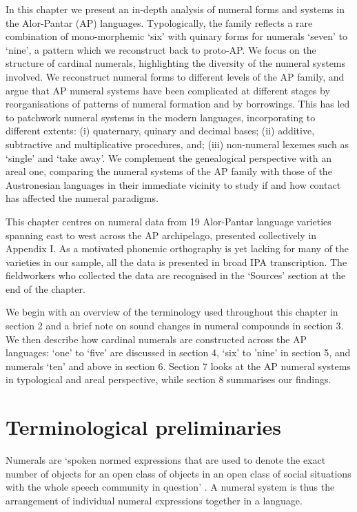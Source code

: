 In this chapter we present an in-depth analysis of numeral forms and systems in the Alor-Pantar (AP) languages. Typologically, the family reflects a rare combination of mono-morphemic `six' with quinary forms for numerals `seven' to `nine', a pattern which we reconstruct back to proto-AP. We focus on the structure of cardinal numerals, highlighting the diversity of the numeral systems involved. We reconstruct numeral forms to different levels of the AP family, and argue that AP numeral systems have been complicated at different stages by reorganisations of patterns of numeral formation and by borrowings. This has led to patchwork numeral systems in the modern languages, incorporating to different extents: (i) quaternary, quinary and decimal bases; (ii) additive, subtractive and multiplicative procedures, and; (iii) non-numeral lexemes such as `single' and `take away'. We complement the genealogical perspective with an areal one, comparing the numeral systems of the AP family with those of the Austronesian languages in their immediate vicinity to study if and how contact has affected the numeral paradigms.

This chapter centres on numeral data from 19 Alor-Pantar language varieties spanning east to west across the AP archipelago, presented collectively in Appendix I. As a motivated phonemic orthography is yet lacking for many of the varieties in our sample, all the data is presented in broad IPA transcription. The fieldworkers who collected the data are recognised in the `Sources' section at the end of the chapter.

We begin with an overview of the terminology used throughout this chapter in section 2 and a brief note on sound changes in numeral compounds in section 3. We then describe how cardinal numerals are constructed across the AP languages: `one' to `five' are discussed in section 4, `six' to 'nine' in section 5, and numerals `ten' and above in section 6. Section 7 looks at the AP numeral systems in typological and areal perspective, while section 8 summarises our findings.

\section{Terminological preliminaries}
Numerals are `spoken normed expressions that are used to denote the exact number of objects for an open class of objects in an open class of social situations with the whole speech community in question' \citep[11]{Hammarstrom2010}. A numeral system is thus the arrangement of individual numeral expressions together in a language.

